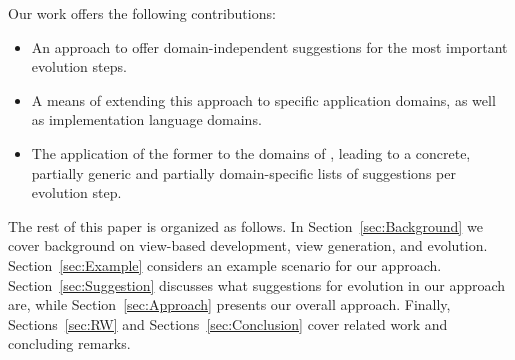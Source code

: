 Our work offers the following contributions:
\begin{itemize}
    \item An approach to offer domain-independent suggestions for the most important \metamodel evolution steps.
    \item A means of extending this approach to specific application domains, as well as implementation language domains.
    \item The application of the former to the domains of , leading to a concrete, partially generic and partially domain-specific lists of suggestions per \metamodel evolution step.
\end{itemize}

 The rest of this paper is organized as follows. In Section~\ref{sec:Background} we cover background on view-based development, view generation, and \metamodel evolution. Section~\ref{sec:Example} considers an example scenario for our approach. Section~\ref{sec:Suggestion} discusses what suggestions for evolution in our approach are, while Section~\ref{sec:Approach} presents our overall approach. %
Finally, Sections~\ref{sec:RW} and Sections~\ref{sec:Conclusion} cover related work and concluding remarks.